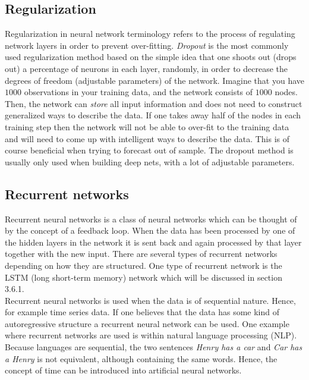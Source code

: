 \documentclass[12pt, letterpaper]{amsart}%
\begin{document}
\subsection{Regularization}
Regularization in neural network terminology refers to the process of regulating network layers in order to prevent over-fitting. \textit{Dropout} is the most commonly used regularization method based on the simple idea that one shoots out (drops out) a percentage of neurons in each layer, randomly, in order to decrease the degrees of freedom (adjustable parameters) of the network. Imagine that you have $1 000$ observations in your training data, and the network consists of $1 000$ nodes. Then, the network can \textit{store} all input information and does not need to construct generalized ways to describe the data. If one takes away half of the nodes in each training step then the network will not be able to over-fit to the training data and will need to come up with intelligent ways to describe the data. This is of course beneficial when trying to forecast out of sample. The dropout method is usually only used when building deep nets, with a lot of adjustable parameters.

\subsection{Recurrent networks}
Recurrent neural networks is a class of neural networks which can be thought of by the concept of a feedback loop. When the data has been processed by one of the hidden layers in the network it is sent back and again processed by that layer together with the new input. There are several types of recurrent networks depending on how they are structured. One type of recurrent network is the LSTM (long short-term memory) network which will be discussed in section 3.6.1.
\\

Recurrent neural networks is used when the data is of sequential nature. Hence, for example time series data. If one believes that the data has some kind of autoregressive structure a recurrent neural network can be used. One example where recurrent networks are used is within natural language processing (NLP). Because languages are sequential, the two sentences \textit{Henry has a car} and \textit{Car has a Henry} is not equivalent, although containing the same words. Hence, the concept of time can be introduced into artificial neural networks.
\end{document}
